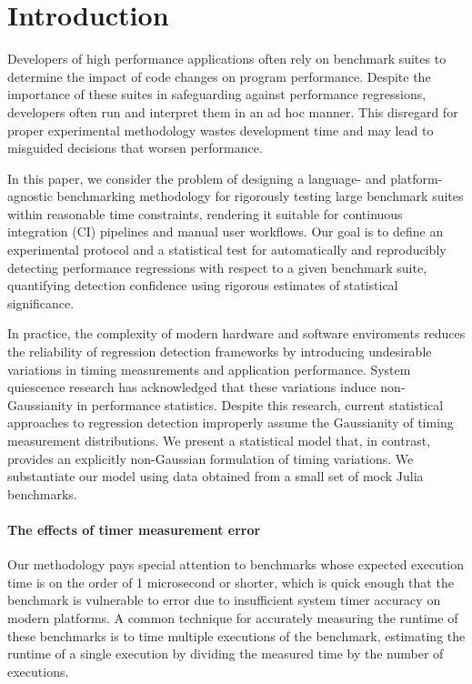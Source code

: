 \documentclass[conference]{IEEEtran}
\begin{document}
\IEEEpeerreviewmaketitle


\label{sec:intro}
\section{Introduction}

Developers of high performance applications often rely on benchmark suites to determine the
impact of code changes on program performance. Despite the importance of these suites in
safeguarding against performance regressions, developers often run and interpret them in an
ad hoc manner. This disregard for proper experimental methodology wastes development time
and may lead to misguided decisions that worsen performance.

In this paper, we consider the problem of designing a language- and platform-agnostic
benchmarking methodology for rigorously testing large benchmark suites within reasonable
time constraints, rendering it suitable for continuous integration (CI) pipelines and manual
user workflows. Our goal is to define an experimental protocol and a statistical test for
automatically and reproducibly detecting performance regressions with respect to a given
benchmark suite, quantifying detection confidence using rigorous estimates of statistical
significance.

In practice, the complexity of modern hardware and software enviroments reduces the
reliability of regression detection frameworks by introducing undesirable variations in
timing measurements and application performance. System quiescence research has acknowledged
that these variations induce non-Gaussianity in performance statistics. Despite this
research, current statistical approaches to regression detection improperly assume the
Gaussianity of timing measurement distributions. We present a statistical model that, in
contrast, provides an explicitly non-Gaussian formulation of timing variations. We
substantiate our model using data obtained from a small set of mock Julia benchmarks.

\label{sec:timererror}
\paragraph{The effects of timer measurement error}

Our methodology pays special attention to benchmarks whose expected execution time is on the
order of 1 microsecond or shorter, which is quick enough that the benchmark is vulnerable to
error due to insufficient system timer accuracy on modern platforms. A common technique for
accurately measuring the runtime of these benchmarks is to time multiple executions of the
benchmark, estimating the runtime of a single execution by dividing the measured time by the
number of executions.
\end{document}
